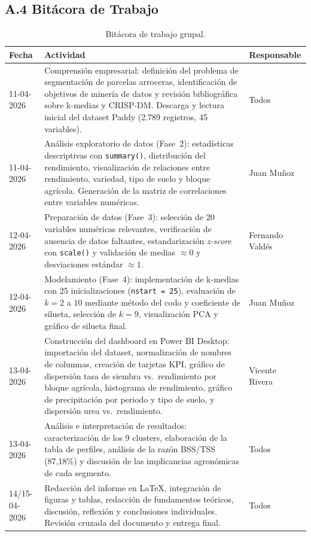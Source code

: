 \documentclass[10pt,a4paper]{article}
\begin{document}
\subsection*{A.4 Bitácora de Trabajo}

\begin{table}[H]
  \centering
  \footnotesize
  \caption{Bitácora de trabajo grupal.}
  \label{tab:bitacora}
  \begin{tabularx}{\textwidth}{l X l}
    \toprule
    \textbf{Fecha} & \textbf{Actividad} & \textbf{Responsable} \\
    \midrule
    11-04-2026 & Comprensión empresarial: definición del problema de segmentación de parcelas arroceras, identificación de objetivos de minería de datos y revisión bibliográfica sobre k-medias y CRISP-DM. Descarga y lectura inicial del dataset Paddy (2.789 registros, 45 variables). & Todos \\
    11-04-2026 & Análisis exploratorio de datos (Fase~2): estadísticas descriptivas con \texttt{summary()}, distribución del rendimiento, visualización de relaciones entre rendimiento, variedad, tipo de suelo y bloque agrícola. Generación de la matriz de correlaciones entre variables numéricas. & Juan Muñoz \\
    12-04-2026 & Preparación de datos (Fase~3): selección de 20 variables numéricas relevantes, verificación de ausencia de datos faltantes, estandarización \textit{z-score} con \texttt{scale()} y validación de medias $\approx 0$ y desviaciones estándar $\approx 1$. & Fernando Valdés \\
    12-04-2026 & Modelamiento (Fase~4): implementación de k-medias con 25 inicializaciones (\texttt{nstart~=~25}), evaluación de $k = 2$ a $10$ mediante método del codo y coeficiente de silueta, selección de $k = 9$, visualización PCA y gráfico de silueta final. & Juan Muñoz \\
    13-04-2026 & Construcción del dashboard en Power BI Desktop: importación del dataset, normalización de nombres de columnas, creación de tarjetas KPI, gráfico de dispersión tasa de siembra vs.\ rendimiento por bloque agrícola, histograma de rendimiento, gráfico de precipitación por periodo y tipo de suelo, y dispersión urea vs.\ rendimiento. & Vicente Rivera \\
    13-04-2026 & Análisis e interpretación de resultados: caracterización de los 9 clusters, elaboración de la tabla de perfiles, análisis de la razón BSS/TSS (87,18\%) y discusión de las implicancias agronómicas de cada segmento. & Todos \\
    14/15-04-2026 & Redacción del informe en \LaTeX{}, integración de figuras y tablas, redacción de fundamentos teóricos, discusión, reflexión y conclusiones individuales. Revisión cruzada del documento y entrega final. & Todos \\
    \bottomrule
  \end{tabularx}
\end{table}
\end{document}
